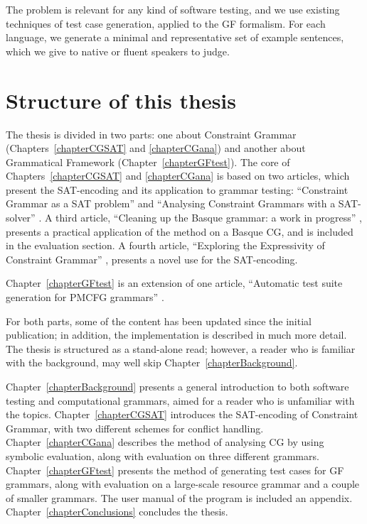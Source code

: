 The problem is relevant for any kind of software testing, and we use existing techniques of test case generation, applied to the GF formalism. For each language, we generate a minimal and representative set of example sentences, which we give to native or fluent speakers to judge.

\section{Structure of this thesis}

The thesis is divided in two parts: one about Constraint Grammar (Chapters~\ref{chapterCGSAT} and \ref{chapterCGana}) and another about Grammatical Framework (Chapter~\ref{chapterGFtest}). The core of Chapters~\ref{chapterCGSAT}  and \ref{chapterCGana} is based on two articles, which present the SAT-encoding and its application to grammar testing: ``Constraint Grammar as a SAT problem'' \cite{listenmaa_claessen2015}
and ``Analysing Constraint Grammars with a SAT-solver'' \cite{listenmaa_claessen2016}.
A third article, ``Cleaning up the Basque grammar: a work in progress'' \cite{listenmaa2017basque}, presents a practical application of the method on a Basque CG, and is included in the evaluation section.
A fourth article, ``Exploring the Expressivity of Constraint Grammar'' \cite{kokke2017expressivity}, presents a novel use for the SAT-encoding.

Chapter~\ref{chapterGFtest} is an extension of one article, ``Automatic test suite generation for PMCFG grammars'' \cite{listenmaa_claessen2018}.

For both parts, some of the content has been updated since the initial publication; in addition, the implementation is described in much more detail. The thesis is structured as a stand-alone read; however, a reader who is familiar with the background, may well skip Chapter~\ref{chapterBackground}.

Chapter~\ref{chapterBackground} presents a general introduction to both software testing and computational grammars, aimed for a reader who is unfamiliar with the topics.
Chapter~\ref{chapterCGSAT} introduces the SAT-encoding of Constraint Grammar, with two different schemes for conflict handling.
Chapter~\ref{chapterCGana}
describes the method of analysing CG by using symbolic evaluation, along with evaluation on three different grammars.
Chapter~\ref{chapterGFtest} presents the method of generating test cases for GF grammars, along with evaluation on a large-scale resource grammar and a couple of smaller grammars. The user manual of the program is included an appendix.
Chapter~\ref{chapterConclusions} concludes the thesis.


